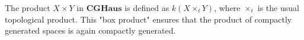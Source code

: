 The product $X \times Y$ in $\mathbf{CGHaus}$ is defined as $k(X \times_t Y)$, where $\times_t$ is the usual topological product. This "box product" ensures that the product of compactly generated spaces is again compactly generated.
